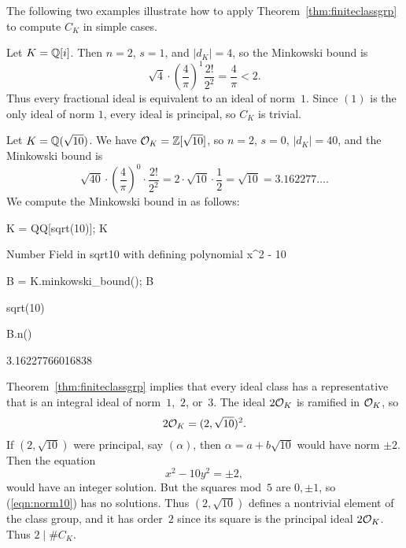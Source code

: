 The following two examples illustrate how to apply
Theorem~\ref{thm:finiteclassgrp} to compute $C_K$ in
simple cases.
\begin{example}
Let $K=\mathbb{Q}[i]$.  Then $n=2$, $s=1$, and $|d_K|=4$, so the Minkowski bound is
$$
\sqrt{4} \cdot \left(\frac{4}{\pi}\right)^1 \frac{2!}{2^2}
  = \frac{4}{\pi} < 2.
$$
Thus every fractional ideal is equivalent to an ideal of norm~$1$.
Since $(1)$ is the only ideal of norm $1$, every ideal is principal,
so $C_K$ is trivial.
\end{example}

\begin{example}
Let $K=\mathbb{Q}(\sqrt{10})$.
We have $\mathcal{O}_K = \mathbb{Z}[\sqrt{10}]$,
so $n=2$, $s=0$, $|d_K| = 40$, and the
Minkowski bound is
$$
  \sqrt{40}\cdot \left(\frac{4}{\pi}\right)^0 \cdot \frac{2!}{2^2}
  = 2\cdot \sqrt{10} \cdot \frac{1}{2} = \sqrt{10} = 3.162277\ldots.
$$
We compute the Minkowski bound in \sage as follows:
\begin{sagecode}
\begin{sagecell}
K = QQ[sqrt(10)]; K
\end{sagecell}
\begin{sageout}
Number Field in sqrt10 with defining polynomial x^2 - 10
\end{sageout}
\begin{sagecell}
B = K.minkowski_bound(); B
\end{sagecell}
\begin{sageout}
sqrt(10)
\end{sageout}
\begin{sagecell}
B.n()
\end{sagecell}
\begin{sageout}
3.16227766016838
\end{sageout}
\end{sagecode}
Theorem~\ref{thm:finiteclassgrp} implies that every ideal class has a
representative that is an integral ideal of norm~$1$,~$2$, or~$3$.
The ideal $2\mathcal{O}_K$ is ramified in $\mathcal{O}_K$, so
$$
  2\mathcal{O}_K = (2,\sqrt{10})^2.
$$
If $(2,\sqrt{10})$ were principal, say $(\alpha)$, then
$\alpha=a+b\sqrt{10}$ would have norm $\pm 2$.
Then the equation
\begin{equation}\label{eqn:norm10}
  x^2 - 10y^2 = \pm 2,
\end{equation}
would have an integer solution.  But the squares mod~$5$ are
$0,\pm 1$, so (\ref{eqn:norm10}) has no solutions.
Thus $(2,\sqrt{10})$ defines a nontrivial element of the class group,
and it has order~$2$ since its square is the principal ideal $2\mathcal{O}_K$.
Thus $2\mid \#C_K$.


\end{example}
